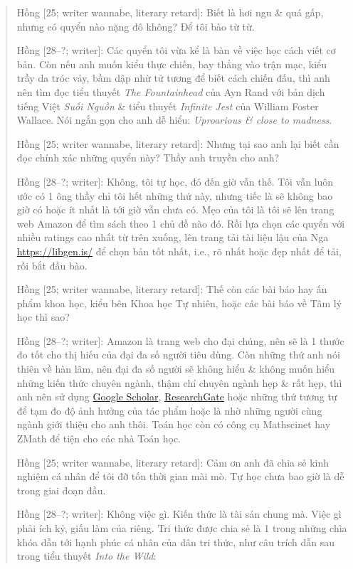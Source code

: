 \documentclass[12pt,oneside]{book}
\begin{document}
\begin{quote}
	{\sf Hồng [25; writer wannabe, literary retard]}: Biết là hơi ngu \& quá gấp, nhưng có quyển nào nặng đô không? Để tôi bào từ từ.
	
	{\sf Hồng [28--?; writer]}: Các quyển tôi vừa kể là bàn về việc học cách viết cơ bản. Còn nếu anh muốn kiểu thực chiến, bay thẳng vào trận mạc, kiểu trầy da tróc vảy, bầm dập nhừ tử tương để biết cách chiến đấu, thì anh nên tìm đọc tiểu thuyết {\it The Fountainhead} \cite{Rand_fountainhead} của {\sc Ayn Rand} với bản dịch tiếng Việt {\it Suối Nguồn} \cite{Rand_fountainhead_VN} \& tiểu thuyết {\it Infinite Jest} \cite{Wallace_jest} của {\sc William Foster Wallace}. Nói ngắn gọn cho anh dễ hiểu: {\it Uproarious \& close to madness}.
	
	{\sf Hồng [25; writer wannabe, literary retard]}: Nhưng tại sao anh lại biết cần đọc chính xác những quyển này? Thầy anh truyền cho anh?
	
	{\sf Hồng [28--?; writer]}: Không, tôi tự học, đó đến giờ vẫn thế. Tôi vẫn luôn ước có 1 ông thầy chỉ tôi hết những thứ này, nhưng tiếc là sẽ không bao giờ có hoặc ít nhất là tới giờ vẫn chưa có. Mẹo của tôi là tôi sẽ lên trang web Amazon để tìm sách theo 1 chủ đề nào đó. Rồi lựa chọn các quyển với nhiều ratings cao nhất từ trên xuống, lên trang tải tài liệu lậu của Nga \url{https://libgen.is/} để chọn bản tốt nhất, i.e., rõ nhất hoặc đẹp nhất để tải, rồi bắt đầu bào.
	
	{\sf Hồng [25; writer wannabe, literary retard]}: Thế còn các bài báo hay ấn phẩm khoa học, kiểu bên Khoa học Tự nhiên, hoặc các bài báo về Tâm lý học thì sao?
	
	{\sf Hồng [28--?; writer]}: Amazon là trang web cho đại chúng, nên sẽ là 1 thước đo tốt cho thị hiếu của đại đa số người tiêu dùng. Còn những thứ anh nói thiên về hàn lâm, nên đại đa số người sẽ không hiểu \& không muốn hiểu những kiến thức chuyên ngành, thậm chí chuyên ngành hẹp \& rất hẹp, thì anh nên sử dụng \href{https://scholar.google.com/}{Google Scholar}, \href{https://www.researchgate.net/}{ResearchGate} hoặc những thứ tương tự để tạm đo độ ảnh hưởng của tác phẩm hoặc là nhờ những người cùng ngành giới thiệu cho anh thôi. Toán học còn có công cụ Mathscinet hay ZMath để tiện cho các nhà Toán học.
	
	{\sf Hồng [25; writer wannabe, literary retard]}: Cảm ơn anh đã chia sẻ kinh nghiệm cá nhân để tôi đỡ tốn thời gian mài mò. Tự học chưa bao giờ là dễ trong giai đoạn đầu.
	
	{\sf Hồng [28--?; writer]}: Không việc gì. Kiến thức là tài sản chung mà. Việc gì phải ích kỷ, giấu làm của riêng. Tri thức được chia sẻ là 1 trong những chìa khóa dẫn tới hạnh phúc cá nhân của dân tri thức, như câu trích dẫn sau trong tiểu thuyết {\it Into the Wild}:
\end{quote}
\end{document}
